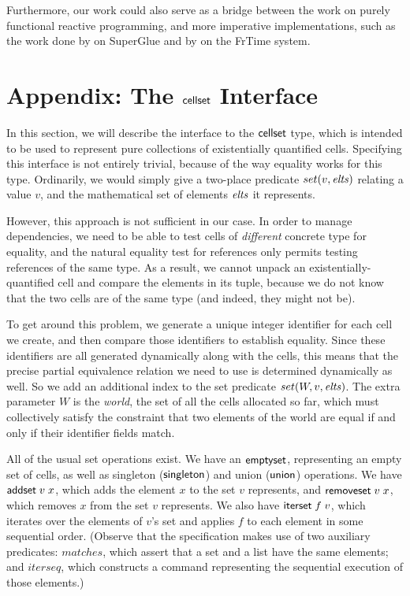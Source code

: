 Furthermore, our work could also serve as a bridge between the work on
purely functional reactive programming, and more imperative
implementations, such as the work done by \citet{superglue} on
SuperGlue and by \citet{frtime} on the FrTime system.


\section{Appendix: The $\mathsf{cellset}$ Interface}

In this section, we will describe the interface to the $\mathsf{cellset}$ type,
which is intended to be used to represent pure collections of
existentially quantified cells. Specifying this interface is not
entirely trivial, because of the way equality works for this
type. Ordinarily, we would simply give a two-place predicate $set(v,
\mathit{elts})$ relating a value $v$, and the mathematical set of elements
$\mathit{elts}$ it represents.

However, this approach is not sufficient in our case. In order to
manage dependencies, we need to be able to test cells of
\emph{different} concrete type for equality, and the natural equality
test for references only permits testing references of the same
type. As a result, we cannot unpack an existentially-quantified cell
and compare the elements in its tuple, because we do not know that the
two cells are of the same type (and indeed, they might not be).

To get around this problem, we generate a unique integer identifier
for each cell we create, and then compare those identifiers to
establish equality. Since these identifiers are all generated
dynamically along with the cells, this means that the precise partial
equivalence relation we need to use is determined dynamically as
well. So we add an additional index to the set predicate $set(W, v,
\mathit{elts})$. The extra parameter $W$ is the \emph{world}, the set of all
the cells allocated so far, which must collectively satisfy the
constraint that two elements of the world are equal if and only if their
identifier fields match.

All of the usual set operations exist. We have an $\mathsf{emptyset}$,
representing an empty set of cells, as well as singleton
($\mathsf{singleton}$) and union ($\mathsf{union}$) operations.  We have
$\mathsf{addset}\;v\;x$, which adds the element $x$ to the set $v$
represents, and $\mathsf{removeset}\;v\;x$, which removes $x$ from the
set $v$ represents. We also have $\mathsf{iterset}\;f\;v$, which
iterates over the elements of $v$'s set and applies $f$ to each
element in some sequential order. (Observe that the specification
makes use of two auxiliary predicates: $matches$, which assert that a
set and a list have the same elements; and $iterseq$, which constructs
a command representing the sequential execution of those elements.)

